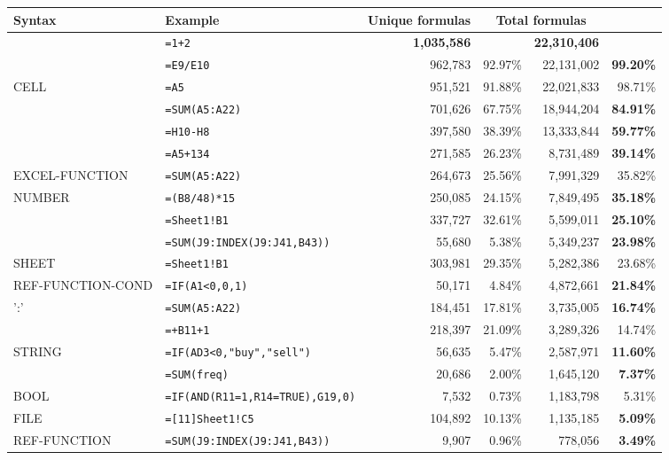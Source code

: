 \begin{tabular}{llrrrrr}
		\hline
		Syntax & Example &  \multicolumn{2}{c}{Unique formulas} & \multicolumn{2}{c}{Total formulas} \\
		\hline
			\synt{Formula} & \texttt{=1+2} &  & \textbf{1,035,586} & & \textbf{22,310,406} & \\
			\synt{Reference} & \texttt{=E9/E10} &  & 962,783 & 92.97\% & 22,131,002 & \textbf{99.20\%}\\
			CELL & \texttt{=A5} &  & 951,521 & 91.88\% & 22,021,833 & 98.71\%\\
			\synt{FunctionCall} & \texttt{=SUM(A5:A22)} &  & 701,626 & 67.75\% & 18,944,204 & \textbf{84.91\%}\\
			\synt{BinOp} & \texttt{=H10-H8} &  & 397,580 & 38.39\% & 13,333,844 & \textbf{59.77\%}\\
			\synt{Constant} & \texttt{=A5+134} &  & 271,585 & 26.23\% & 8,731,489 & \textbf{39.14\%}\\
			EXCEL-FUNCTION & \texttt{=SUM(A5:A22)} &  & 264,673 & 25.56\% & 7,991,329 & 35.82\%\\
			NUMBER & \texttt{=(B8/48)*15} &  & 250,085 & 24.15\% & 7,849,495 & \textbf{35.18\%}\\
			\synt{Prefix} & \texttt{=Sheet1!B1} &  & 337,727 & 32.61\% & 5,599,011 & \textbf{25.10\%}\\
			\synt{RefFunctionName} & \texttt{=SUM(J9:INDEX(J9:J41,B43))} &  & 55,680 & 5.38\% & 5,349,237 & \textbf{23.98\%}\\
			SHEET & \texttt{=Sheet1!B1} &  & 303,981 & 29.35\% & 5,282,386 & 23.68\%\\
			REF-FUNCTION-COND & \texttt{=IF(A1<0,0,1)} &  & 50,171 & 4.84\% & 4,872,661 & \textbf{21.84\%}\\
			\synt{Reference} ':' \synt{Reference} & \texttt{=SUM(A5:A22)} &  & 184,451 & 17.81\% & 3,735,005 & \textbf{16.74\%}\\
			\synt{UnOpPrefix} & \texttt{=+B11+1} &  & 218,397 & 21.09\% & 3,289,326 & 14.74\%\\
			STRING & \texttt{=IF(AD3<0,"buy","sell")} &  & 56,635 & 5.47\% & 2,587,971 & \textbf{11.60\%}\\
			\synt{NamedRange} & \texttt{=SUM(freq)} &  & 20,686 & 2.00\% & 1,645,120 & \textbf{7.37\%}\\
			BOOL & \texttt{=IF(AND(R11=1,R14=TRUE),G19,0)} &  & 7,532 & 0.73\% & 1,183,798 & 5.31\%\\
			FILE & \texttt{=[11]Sheet1!C5} &  & 104,892 & 10.13\% & 1,135,185 & \textbf{5.09\%}\\
			REF-FUNCTION & \texttt{=SUM(J9:INDEX(J9:J41,B43))} &  & 9,907 & 0.96\% & 778,056 & \textbf{3.49\%}\\
			

\end{tabular}
